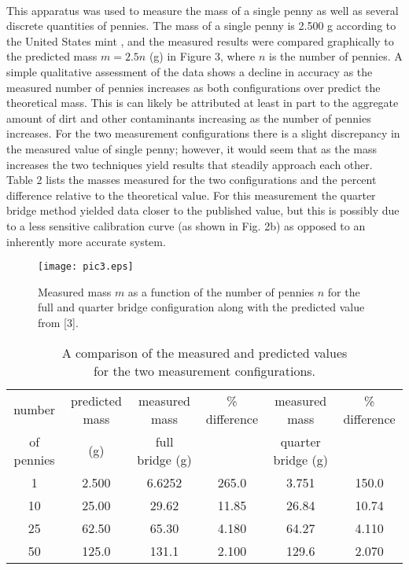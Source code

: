 \documentclass[12pt, letterpaper]{article}
\begin{document}
\mbox{} \\
This apparatus was used to measure the mass of a single penny as well as
several discrete quantities of pennies. The mass of a single penny is 2.500 g
according to the United States mint \cite{us}, and the measured results were
compared graphically to the predicted mass $m = 2.5n$ (g) in Figure 3, where
$n$ is the number of pennies. A simple qualitative assessment of the data
shows a decline in accuracy as the measured number of pennies increases as
both configurations over predict the theoretical mass. This is can likely be
attributed at least in part to the aggregate amount of dirt and other
contaminants increasing as the number of pennies increases. For the two
measurement configurations there is a slight discrepancy in the measured value
of single penny; however, it would seem that as the mass increases the two
techniques yield results that steadily approach each other. Table 2 lists the
masses measured for the two configurations and the percent difference relative
to the theoretical value. For this measurement the quarter bridge method
yielded data closer to the published value, but this is possibly due to a less
sensitive calibration curve (as shown in Fig. 2b) as opposed to an inherently
more accurate system.


\begin{figure}[h!]
\begin{center}
\texttt{[image: pic3.eps]}
\caption{Measured mass $m$ as a function of the number of pennies $n$
   for the full and quarter bridge configuration along with the
predicted value from [3].}
\label{pic3.fig}
\end{center}
\end{figure}

\begin{table}
\centering
\caption{A comparison of the measured and predicted values \\  for the two measurement configurations.}
\begin{tabular}{c c c c c c} \toprule
number      & predicted mass & measured mass & \% difference & measured mass  &\% difference \\
of pennies  & (g)                   &  full bridge (g)   &                       & quarter bridge (g)  &   \\ \midrule
1 & 2.500 & 6.6252 & 265.0 & 3.751 & 150.0 \\ \midrule
10 & 25.00 & 29.62 & 11.85 & 26.84 & 10.74 \\ \midrule
25 & 62.50 & 65.30 & 4.180 & 64.27 & 4.110 \\ \midrule
50 & 125.0 & 131.1 & 2.100 & 129.6 & 2.070 \\ \bottomrule
\end{tabular}
\label{table 2}

\end{table}
\end{document}
